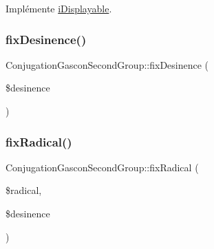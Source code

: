 Implémente \hyperlink{interfacei_displayable_a0264fd455c876e897f754cf85f1681ca}{i\+Displayable}.

\hypertarget{class_conjugation_gascon_second_group_ae8d66e6a63002678daa884d3ca3a8ac1}{}\label{class_conjugation_gascon_second_group_ae8d66e6a63002678daa884d3ca3a8ac1} 
\subsubsection{\texorpdfstring{fix\+Desinence()}{fixDesinence()}}
{\footnotesize\ttfamily Conjugation\+Gascon\+Second\+Group\+::fix\+Desinence (\begin{DoxyParamCaption}\item[{}]{\$desinence }\end{DoxyParamCaption})\hspace{0.3cm}{\ttfamily [protected]}}

\hypertarget{class_conjugation_gascon_second_group_ad51616cc8f2024140f71255e7fcc681f}{}\label{class_conjugation_gascon_second_group_ad51616cc8f2024140f71255e7fcc681f} 
\subsubsection{\texorpdfstring{fix\+Radical()}{fixRadical()}}
{\footnotesize\ttfamily Conjugation\+Gascon\+Second\+Group\+::fix\+Radical (\begin{DoxyParamCaption}\item[{}]{\$radical,  }\item[{}]{\$desinence }\end{DoxyParamCaption})\hspace{0.3cm}{\ttfamily [protected]}}

\hypertarget{class_conjugation_gascon_second_group_a3702a68d3d15efe2b5109fe8800f7418}{}\label{class_conjugation_gascon_second_group_a3702a68d3d15efe2b5109fe8800f7418} 
